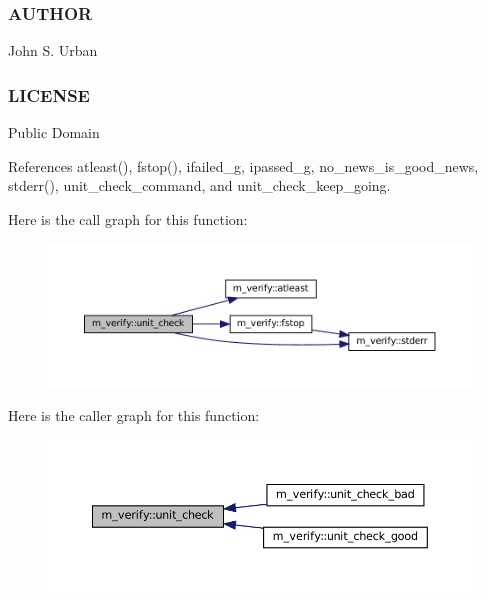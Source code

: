 \subsubsection*{A\+U\+T\+H\+OR}

John S. Urban \subsubsection*{L\+I\+C\+E\+N\+SE}

Public Domain 

References atleast(), fstop(), ifailed\+\_\+g, ipassed\+\_\+g, no\+\_\+news\+\_\+is\+\_\+good\+\_\+news, stderr(), unit\+\_\+check\+\_\+command, and unit\+\_\+check\+\_\+keep\+\_\+going.

Here is the call graph for this function\+:\nopagebreak
\begin{figure}[H]
\begin{center}
\leavevmode
\includegraphics[width=350pt]{namespacem__verify_a96149da1a302f2a157d79dadc94e755e_cgraph}
\end{center}
\end{figure}
Here is the caller graph for this function\+:\nopagebreak
\begin{figure}[H]
\begin{center}
\leavevmode
\includegraphics[width=350pt]{namespacem__verify_a96149da1a302f2a157d79dadc94e755e_icgraph}
\end{center}
\end{figure}
\mbox{\label{namespacem__verify_aaa2744e5ab1687072183869bd53cc086}} 
